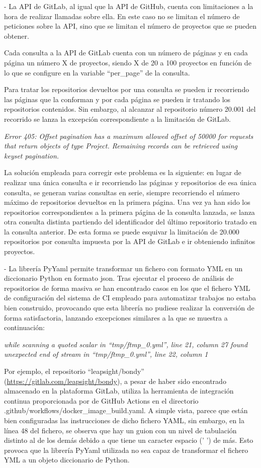 - La API de GitLab, al igual que la API de GitHub, cuenta con limitaciones a la hora de realizar llamadas sobre ella. En este caso no se limitan el número de peticiones sobre la API, sino que se limitan el número de proyectos que se pueden obtener.

Cada consulta a la API de GitLab cuenta con un número de páginas y en cada página un número X de proyectos, siendo X de 20 a 100 proyectos en función de lo que se configure en la variable ``per\_page'' de la consulta. 

Para tratar los repositorios devueltos por una consulta se pueden ir recorriendo las páginas que la conforman y por cada página se pueden ir tratando los repositorios contenidos. Sin embargo, al alcanzar al repositorio número 20.001 del recorrido se lanza la excepción correspondiente a la limitación de GitLab.

\textit{Error 405: Offset pagination has a maximum allowed offset of 50000 for requests that return objects of type Project. Remaining records can be retrieved using keyset pagination.}

La solución empleada para corregir este problema es la siguiente: en lugar de realizar una única consulta e ir recorriendo las páginas y repositorios de esa única consulta, se generan varias consultas en serie, siempre recorriendo el número máximo de repositorios devueltos en la primera página. Una vez ya han sido los repositorios correspondientes a la primera página de la consulta lanzada, se lanza otra consulta distinta partiendo del identificador del último repositorio tratado en la consulta anterior. De esta forma se puede esquivar la limitación de 20.000 repositorios por consulta impuesta por la API de GitLab e ir obteniendo infinitos proyectos.

- La librería PyYaml permite transformar un fichero con formato YML en un diccionario Python en formato json. Tras ejecutar el proceso de análisis de repositorios de forma masiva se han encontrado casos en los que el fichero YML de configuración del sistema de CI empleado para automatizar trabajos no estaba bien construido, provocando que esta librería no pudiese realizar la conversión de forma satisfactoria, lanzando excepciones similares a la que se muestra a continuación:

\textit{while scanning a quoted scalar in ``tmp/ftmp\_0.yml'', line 21, column 27 found unexpected end of stream in ``tmp/ftmp\_0.yml'', line 22, column 1}

Por ejemplo, el repositorio ``leapsight/bondy'' (\url{https://gitlab.com/leapsight/bondy}), a pesar de haber sido encontrado almacenado en la plataforma GitLab, utiliza la herramienta de integración continua proporcionada por de GitHub Actions en el directorio .github/workflows/docker\_image\_build.yaml. A simple vista, parece que están bien configuradas las instrucciones de dicho fichero YAML, sin embargo, en la línea 48 del fichero, se observa que hay un guion con un nivel de tabulación distinto al de los demás debido a que tiene un caracter espacio (' ') de más. Esto provoca que la librería PyYaml utilizada no sea capaz de transformar el fichero YML a un objeto diccionario de Python. 

